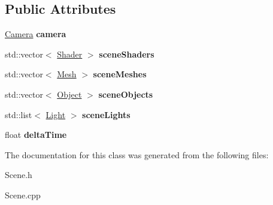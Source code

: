 \subsection*{Public Attributes}
\begin{DoxyCompactItemize}
\item 
\mbox{\label{class_scene_afed13ec4ba2d7ab75b273d507911b498}} 
\hyperlink{class_camera}{Camera} {\bfseries camera}
\item 
\mbox{\label{class_scene_a5f692c13f2db4299793ffc4d36c7e2ba}} 
std\+::vector$<$ \hyperlink{class_shader}{Shader} $>$ {\bfseries scene\+Shaders}
\item 
\mbox{\label{class_scene_a7be2dbccfae00f70b1d07b2c4d738ece}} 
std\+::vector$<$ \hyperlink{class_mesh}{Mesh} $>$ {\bfseries scene\+Meshes}
\item 
\mbox{\label{class_scene_ad9e4d19ec059a134617ee31d1df03714}} 
std\+::vector$<$ \hyperlink{class_object}{Object} $>$ {\bfseries scene\+Objects}
\item 
\mbox{\label{class_scene_aa98be8079c5bed3a6a24aa55fe15f3f0}} 
std\+::list$<$ \hyperlink{class_light}{Light} $>$ {\bfseries scene\+Lights}
\item 
\mbox{\label{class_scene_a4624158c6d315465401ccdda659bc13b}} 
float {\bfseries delta\+Time}
\end{DoxyCompactItemize}


The documentation for this class was generated from the following files\+:\begin{DoxyCompactItemize}
\item 
Scene.\+h\item 
Scene.\+cpp\end{DoxyCompactItemize}

